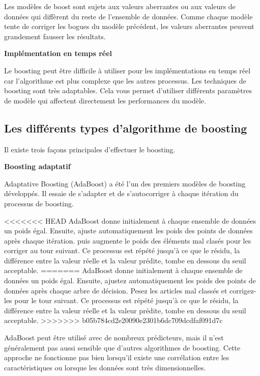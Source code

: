 \documentclass[french,a4paper,12pt]{article}
\begin{document}
\quad Les modèles de boost sont sujets aux valeurs aberrantes ou aux valeurs de données qui diffèrent du reste de l'ensemble de données. Comme chaque modèle tente de corriger les bogues du modèle précédent, les valeurs aberrantes peuvent grandement fausser les résultats\citep{AWS}.


\textbf{Implémentation en temps réel}

\quad Le boosting peut être difficile à utiliser pour les implémentations en temps réel car l'algorithme est plus complexe que les autres processus. Les techniques de boosting sont très adaptables. Cela vous permet d'utiliser différents paramètres de modèle qui affectent directement les performances du modèle.

\subsection{ Les différents types d'algorithme de boosting}


\quad Il existe trois façons principales d’effectuer le boosting.

\textbf{Boosting adaptatif }

\quad Adaptative Boosting (AdaBoost) a été l'un des premiers modèles de boosting développés. Il essaie de s'adapter et de s'autocorriger à chaque itération du processus de boosting.


<<<<<<< HEAD
\quad AdaBoost donne initialement à chaque ensemble de données un poids égal. Ensuite, ajuste automatiquement les poids des points de données après chaque itération. puis augmente le poids des éléments mal clasés pour les corriger au tour suivant. Ce processus est répété jusqu'à ce que le résidu, la différence entre la valeur réelle et la valeur prédite, tombe en dessous du seuil acceptable\citep{adaboost}.
=======
\quad AdaBoost donne initialement à chaque ensemble de données un poids égal. Ensuite, ajustez automatiquement les poids des points de données après chaque arbre de décision. Pesez les articles mal classés et corrigez-les pour le tour suivant. Ce processus est répété jusqu'à ce que le résidu, la différence entre la valeur réelle et la valeur prédite, tombe en dessous du seuil acceptable\citep{adaboost}.
>>>>>>> b05b784cd2e20090e2301b6dc709dcdfaf091d7c

\quad AdaBoost peut être utilisé avec de nombreux prédicteurs, mais il n'est généralement pas aussi sensible que d'autres algorithmes de boosting. Cette approche ne fonctionne pas bien lorsqu'il existe une corrélation entre les caractéristiques ou lorsque les données sont très dimensionnelles. 
\end{document}
